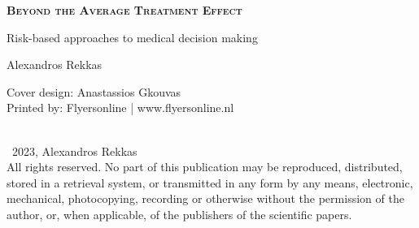 


\clearpage\null\pagestyle{empty}
\newpage


\pagestyle{empty}

\def\drop{.1\textheight}

\vspace*{6cm}
\begin{center}
\Large \textbf{\textsc{Beyond the Average Treatment Effect}}\par
\Large Risk-based approaches to medical decision making \par

\vspace*{1.8cm}

\Large Alexandros Rekkas

\end{center}

\clearpage

\thispagestyle{empty}
\vspace*{12cm}

\begingroup %
\small
\setlength{\parskip}{\baselineskip} %
\setlength\parindent{0pt} %
Cover design: Anastassios Gkouvas \\
Printed by: Flyersonline | www.flyersonline.nl\\
\\
\begin{flushleft}
\textcopyright\ 2023, Alexandros Rekkas \\
All rights reserved. No part of this publication may be reproduced, distributed,
stored in a retrieval system, or transmitted in any form by any means, electronic,
mechanical, photocopying, recording or otherwise without the permission of the
author, or, when applicable, of the publishers of the scientific papers.
\end{flushleft}

\endgroup

\newpage
\thispagestyle{empty}

